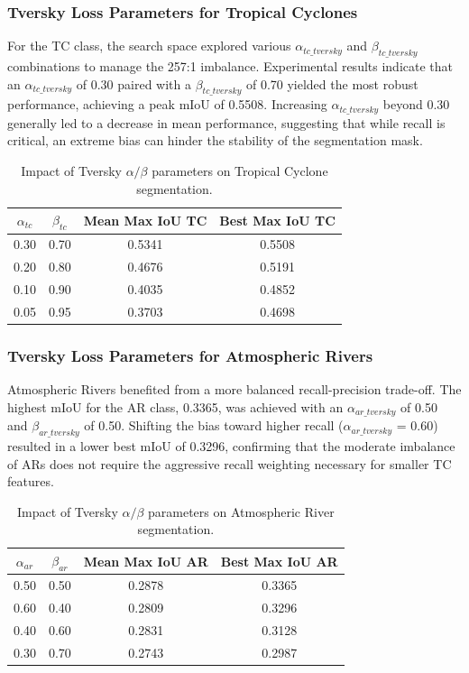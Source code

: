 \subsubsection{Tversky Loss Parameters for Tropical Cyclones}
For the TC class, the search space explored various $\alpha_{tc\_tversky}$ and $\beta_{tc\_tversky}$ combinations to manage the 257:1 imbalance. Experimental results indicate that an $\alpha_{tc\_tversky}$ of 0.30 paired with a $\beta_{tc\_tversky}$ of 0.70 yielded the most robust performance, achieving a peak mIoU of 0.5508. Increasing $\alpha_{tc\_tversky}$ beyond 0.30 generally led to a decrease in mean performance, suggesting that while recall is critical, an extreme bias can hinder the stability of the segmentation mask.

\begin{table}[h]
\centering
\begin{tabular}{@{}cccc@{}}
\toprule
$\alpha_{tc}$ & $\beta_{tc}$ & Mean Max IoU TC & Best Max IoU TC\\ \midrule
0.30 & 0.70 & 0.5341 & 0.5508 \\
0.20 & 0.80 & 0.4676 & 0.5191 \\
0.10 & 0.90 & 0.4035 & 0.4852 \\
0.05 & 0.95 & 0.3703 & 0.4698 \\ \bottomrule
\end{tabular}
\caption{Impact of Tversky $\alpha/\beta$ parameters on Tropical Cyclone segmentation.}
\end{table}


\subsubsection{Tversky Loss Parameters for Atmospheric Rivers}
Atmospheric Rivers benefited from a more balanced recall-precision trade-off. The highest mIoU for the AR class, 0.3365, was achieved with an $\alpha_{ar\_tversky}$ of 0.50 and $\beta_{ar\_tversky}$ of 0.50. Shifting the bias toward higher recall ($\alpha_{ar\_tversky}$ = 0.60) resulted in a lower best mIoU of 0.3296, confirming that the moderate imbalance of ARs does not require the aggressive recall weighting necessary for smaller TC features.

\begin{table}[h]
\centering
\begin{tabular}{@{}cccc@{}}
\toprule
$\alpha_{ar}$ & $\beta_{ar}$ & Mean Max IoU AR& Best Max IoU AR\\ \midrule
0.50 & 0.50 & 0.2878 & 0.3365 \\
0.60 & 0.40 & 0.2809 & 0.3296 \\
0.40 & 0.60 & 0.2831 & 0.3128 \\
0.30 & 0.70 & 0.2743 & 0.2987 \\ \bottomrule
\end{tabular}
\caption{Impact of Tversky $\alpha/\beta$ parameters on Atmospheric River segmentation.}
\end{table}

